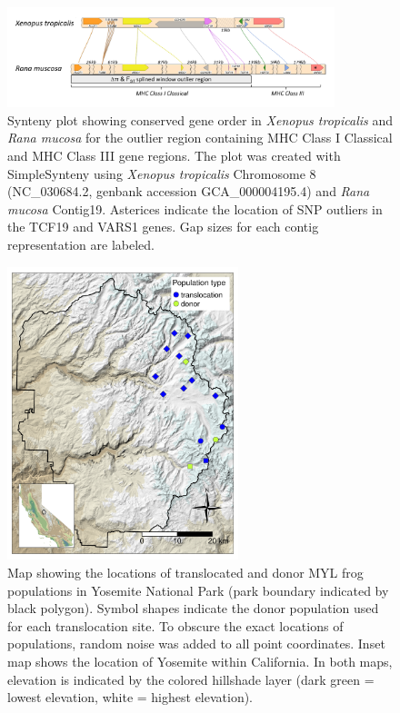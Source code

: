 \documentclass[9pt,twoside,lineno]{pnas-new}
\begin{document}
\begin{figure}

{\centering \includegraphics[width=0.85\textwidth]{figures/synteny_figure.png}

}

\caption{\label{fig-synteny-plot}Synteny plot showing conserved gene
order in \emph{Xenopus tropicalis} and \emph{Rana mucosa} for the
outlier region containing MHC Class I Classical and MHC Class III gene
regions. The plot was created with SimpleSynteny \citep{veltri2016}
using \emph{Xenopus tropicalis} Chromosome 8 (NC\_030684.2, genbank
accession GCA\_000004195.4) and \emph{Rana mucosa} Contig19. Asterices
indicate the location of SNP outliers in the TCF19 and VARS1 genes. Gap
sizes for each contig representation are labeled.}

\end{figure}\clearpage

\newpage

\begin{figure}

{\centering \includegraphics[width=0.60\textwidth]{figures/map_translocation_points.png}

}

\caption{\label{fig-yosemap}Map showing the locations of translocated
and donor MYL frog populations in Yosemite National Park (park boundary
indicated by black polygon). Symbol shapes indicate the donor population
used for each translocation site. To obscure the exact locations of
populations, random noise was added to all point coordinates. Inset map
shows the location of Yosemite within California. In both maps,
elevation is indicated by the colored hillshade layer (dark green =
lowest elevation, white = highest elevation).}

\end{figure}\clearpage
\end{document}
